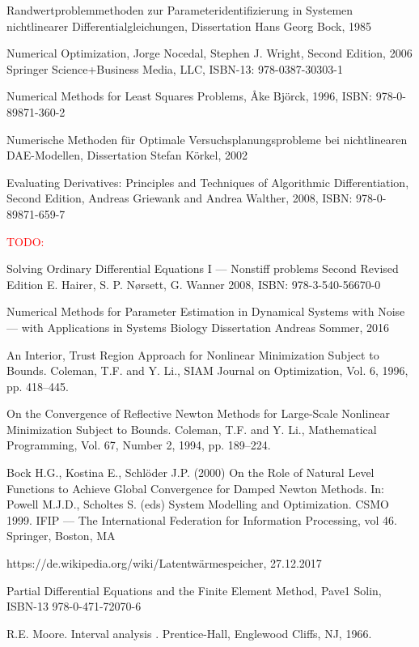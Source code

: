 \documentclass{scrartcl}[12pt, halfparskip]
\numberwithin{equation}{section}
\numberwithin{figure}{section}
\numberwithin{table}{section}
\newcommand{\todo}[1]{\textcolor{red}{TODO: #1}}
\begin{document}
\begin{thebibliography}{9}
	Randwertproblemmethoden zur Parameteridentifizierung in Systemen nichtlinearer Differentialgleichungen,
	Dissertation Hans Georg Bock, 1985
	
	Numerical Optimization,
	Jorge Nocedal, Stephen J. Wright,
	Second Edition, 2006 Springer Science+Business Media, LLC, ISBN-13: 978-0387-30303-1
	
	Numerical Methods for Least Squares Problems,
	Åke Björck, 1996,
	ISBN: 978-0-89871-360-2
	
	Numerische Methoden
	für Optimale Versuchsplanungsprobleme
	bei nichtlinearen DAE-Modellen,
	Dissertation Stefan Körkel, 2002
	
	Evaluating Derivatives: Principles and Techniques of Algorithmic Differentiation, Second Edition,
	Andreas Griewank and Andrea Walther, 2008,
	ISBN: 978-0-89871-659-7
	
	\todo{}


	Solving Ordinary Differential Equations I --- Nonstiff problems
	Second Revised Edition
	E. Hairer, S. P. Nørsett, G. Wanner 
	2008, ISBN: 978-3-540-56670-0
	
	Numerical Methods for Parameter Estimation
	in Dynamical Systems with Noise --- with Applications in Systems Biology
	Dissertation Andreas Sommer, 2016
	
	An Interior, Trust Region Approach for Nonlinear Minimization Subject to Bounds.
	Coleman, T.F. and Y. Li., 
	SIAM Journal on Optimization, Vol. 6, 1996, pp. 418–445.
  
	On the Convergence of Reflective Newton Methods for Large-Scale Nonlinear Minimization Subject to Bounds.
	Coleman, T.F. and Y. Li., 
	Mathematical Programming, Vol. 67, Number 2, 1994, pp. 189–224.
	
	Bock H.G., Kostina E., Schlöder J.P. (2000) On the Role of Natural Level Functions to Achieve Global Convergence for Damped Newton Methods. In: Powell M.J.D., Scholtes S. (eds) System Modelling and Optimization. CSMO 1999. IFIP — The International Federation for Information Processing, vol 46. Springer, Boston, MA
	
	https://de.wikipedia.org/wiki/Latentwärmespeicher, 27.12.2017
	
	Partial Differential Equations and the Finite Element Method,
	Pave1 Solin, 
	ISBN-13 978-0-471-72070-6
	
	R.E. Moore. Interval analysis . Prentice-Hall, Englewood Cliffs, NJ, 1966.
  
\end{thebibliography}
\end{document}
